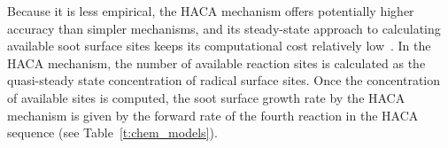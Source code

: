 \documentclass[preprint,letterpaper]{elsarticle}
\begin{document}
Because it is less empirical, the HACA mechanism offers potentially higher accuracy than simpler mechanisms, and its steady-state approach to calculating available soot surface sites keeps its computational cost relatively low~\cite{Appel_2000}. In the HACA mechanism, the number of available reaction sites is calculated as the quasi-steady state concentration of radical surface sites. Once the concentration of available sites is computed, the soot surface growth rate by the HACA mechanism is given by the forward rate of the fourth reaction in the HACA sequence (see Table~\ref{t:chem_models}).



\end{document}
